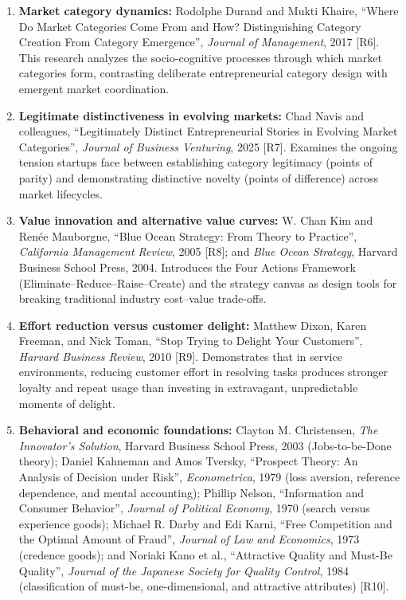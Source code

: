 \begin{enumerate}
    \item \textbf{Market category dynamics:} Rodolphe Durand and Mukti Khaire, ``Where Do Market Categories Come From and How? Distinguishing Category Creation From Category Emergence'', \emph{Journal of Management}, 2017 [R6]. This research analyzes the socio-cognitive processes through which market categories form, contrasting deliberate entrepreneurial category design with emergent market coordination.
    \item \textbf{Legitimate distinctiveness in evolving markets:} Chad Navis and colleagues, ``Legitimately Distinct Entrepreneurial Stories in Evolving Market Categories'', \emph{Journal of Business Venturing}, 2025 [R7]. Examines the ongoing tension startups face between establishing category legitimacy (points of parity) and demonstrating distinctive novelty (points of difference) across market lifecycles.
    \item \textbf{Value innovation and alternative value curves:} W. Chan Kim and Renée Mauborgne, ``Blue Ocean Strategy: From Theory to Practice'', \emph{California Management Review}, 2005 [R8]; and \emph{Blue Ocean Strategy}, Harvard Business School Press, 2004. Introduces the Four Actions Framework (Eliminate--Reduce--Raise--Create) and the strategy canvas as design tools for breaking traditional industry cost--value trade-offs.
    \item \textbf{Effort reduction versus customer delight:} Matthew Dixon, Karen Freeman, and Nick Toman, ``Stop Trying to Delight Your Customers'', \emph{Harvard Business Review}, 2010 [R9]. Demonstrates that in service environments, reducing customer effort in resolving tasks produces stronger loyalty and repeat usage than investing in extravagant, unpredictable moments of delight.
    \item \textbf{Behavioral and economic foundations:} Clayton M. Christensen, \emph{The Innovator's Solution}, Harvard Business School Press, 2003 (Jobs-to-be-Done theory); Daniel Kahneman and Amos Tversky, ``Prospect Theory: An Analysis of Decision under Risk'', \emph{Econometrica}, 1979 (loss aversion, reference dependence, and mental accounting); Phillip Nelson, ``Information and Consumer Behavior'', \emph{Journal of Political Economy}, 1970 (search versus experience goods); Michael R. Darby and Edi Karni, ``Free Competition and the Optimal Amount of Fraud'', \emph{Journal of Law and Economics}, 1973 (credence goods); and Noriaki Kano et al., ``Attractive Quality and Must-Be Quality'', \emph{Journal of the Japanese Society for Quality Control}, 1984 (classification of must-be, one-dimensional, and attractive attributes) [R10].
\end{enumerate}

